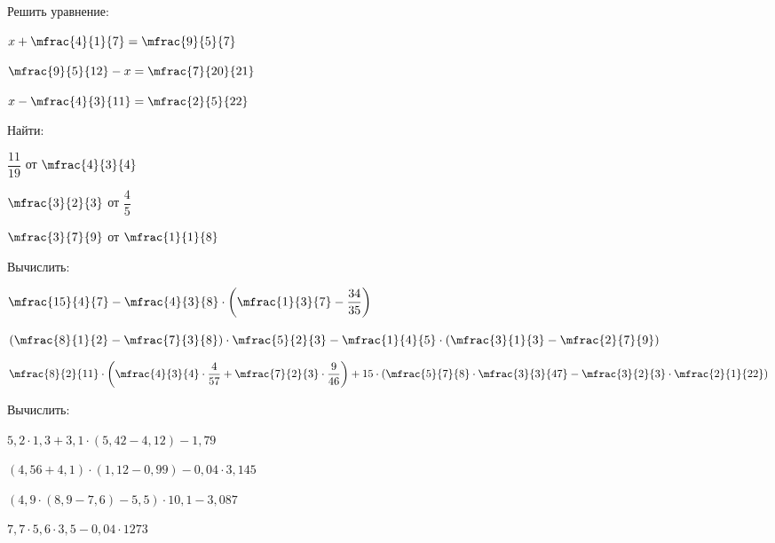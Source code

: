 \begin{class}[type=homework, number=2]
	\begin{listofex}
		\item Решить уравнение:
		\begin{enumcols}[itemcolumns=3]
			\item \( x+\mfrac{4}{1}{7}=\mfrac{9}{5}{7} \)
			\item \( \mfrac{9}{5}{12}-x=\mfrac{7}{20}{21} \)
			\item \( x-\mfrac{4}{3}{11}=\mfrac{2}{5}{22} \)
		\end{enumcols}
		\item Найти:
		\begin{enumcols}[itemcolumns=3]
			\item \( \dfrac{11}{19} \) от \( \mfrac{4}{3}{4} \)
			\item \( \mfrac{3}{2}{3} \) от \( \dfrac{4}{5} \)
			\item \( \mfrac{3}{7}{9} \) от \( \mfrac{1}{1}{8} \)
		\end{enumcols}
		\item Вычислить: %
		\begin{enumcols}[itemcolumns=2]
			\item \( \mfrac{15}{4}{7}-\mfrac{4}{3}{8}\cdot\left( \mfrac{1}{3}{7}-\dfrac{34}{35} \right) \)
			\item \( \left( \mfrac{8}{1}{2}-\mfrac{7}{3}{8} \right)\cdot\mfrac{5}{2}{3}-\mfrac{1}{4}{5}\cdot\left( \mfrac{3}{1}{3}-\mfrac{2}{7}{9} \right) \)
		\end{enumcols}
		\begin{enumcols}[itemcolumns=1, resume]
			\item \( \mfrac{8}{2}{11}\cdot\left( \mfrac{4}{3}{4}\cdot\dfrac{4}{57}+\mfrac{7}{2}{3}\cdot\dfrac{9}{46} \right)+15\cdot\left( \mfrac{5}{7}{8}\cdot\mfrac{3}{3}{47}-\mfrac{3}{2}{3}\cdot\mfrac{2}{1}{22} \right) \)
		\end{enumcols}
		\item Вычислить:
		\begin{enumcols}[itemcolumns=2]
			\item \( 5,2\cdot1,3+3,1\cdot(5,42-4,12)-1,79 \)
			\item \( (4,56+4,1)\cdot(1,12-0,99)-0,04\cdot3,145 \)
			\item \( (4,9\cdot(8,9-7,6)-5,5)\cdot10,1-3,087 \)
			\item \( 7,7\cdot5,6\cdot3,5-0,04\cdot1273 \)
		\end{enumcols}
	\end{listofex}
\end{class}
